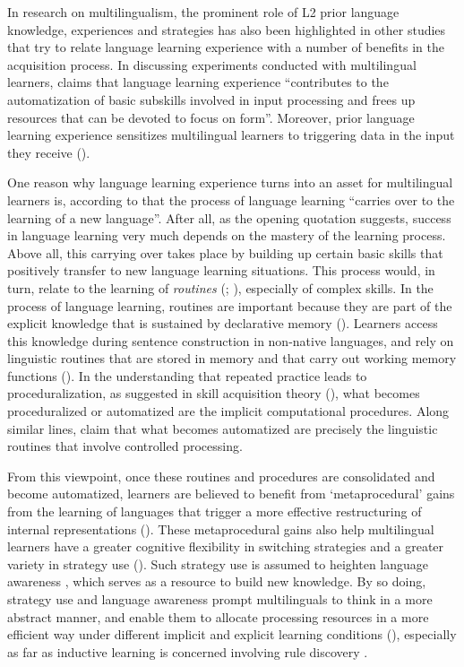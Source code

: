 \documentclass[output=paper,colorlinks,citecolor=brown,nonflat]{../langscibook}
\begin{document}
In research on multilingualism, the prominent role of L2 prior language knowledge, experiences and strategies has also been highlighted in other studies that try to relate language learning experience with a number of benefits in the acquisition process. In discussing experiments conducted with multilingual learners, \citet[35]{Sanz2000} claims that language learning experience “contributes to the automatization of basic subskills involved in input processing and frees up resources that can be devoted to focus on form”. Moreover, prior language learning experience sensitizes multilingual learners to triggering data in the input they receive (\citealt{Zobl1992, Klein1995}).

One reason why language learning experience turns into an asset for multilingual learners is, according to \citet[6]{McLaughlinNayak1989} that the process of language learning “carries over to the learning of a new language”. After all, as the opening quotation suggests, success in language learning very much depends on the mastery of the learning process. Above all, this carrying over takes place by building up certain basic skills that positively transfer to new language learning situations. This process would, in turn, relate to the learning of \textit{routines} (\citealt[360]{Jessner2008Knowledge}; \citealt[804]{RutgersEvans2017}), especially of complex skills. In the process of language learning, routines are important because they are part of the explicit knowledge that is sustained by declarative memory (\citealt{Paradis2009, SharwoodSmith2010, TagarelliEtAl2011}). Learners access this knowledge during sentence construction in non-native languages, and rely on linguistic routines that are stored in memory and that carry out working memory functions (\citealt{BaarsFranklin2003, SharwoodSmith2010}). In the understanding that repeated practice leads to proceduralization, as suggested in skill acquisition theory (\citealt{DeKeyser2007,DeKeyser2010}), what becomes proceduralized or automatized are the implicit computational procedures. Along similar lines, \citet{RutgersEvans2017} claim that what becomes automatized are precisely the linguistic routines that involve controlled processing.

From this viewpoint, once these routines and procedures are consolidated and become automatized, learners are believed to benefit from ‘metaprocedural’ gains from the learning of languages that trigger a more effective restructuring of internal representations (\citealt{McLaughlinNayak1989, NayakEtAl1990}). These metaprocedural gains also help multilingual learners have a greater cognitive flexibility in switching strategies and a greater variety in strategy use (\citealt{Missler2000, Kemp2007}). Such strategy use is assumed to heighten language awareness \citep{Thomas1992}, which serves as a resource to build new knowledge. By so doing, strategy use and language awareness prompt multilinguals to think in a more abstract manner, and enable them to allocate processing resources in a more efficient way under different implicit and explicit learning conditions (\citealt{NationMcLaughlin1986}), especially as far as inductive learning is concerned involving rule discovery \citep{NayakEtAl1990}.
\end{document}
